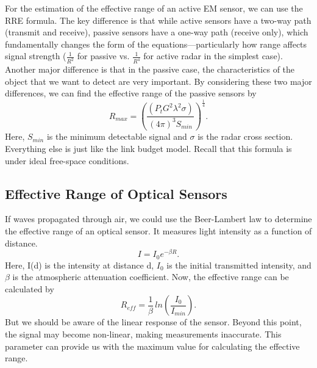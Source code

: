 \documentclass{article}
\begin{document}
For the estimation of the effective range of an active EM sensor, we can use the RRE formula.
The key difference is that while active sensors have a two-way path (transmit and receive), passive sensors have a one-way path (receive only), which fundamentally changes the form of the equations—particularly how range affects signal strength ($\frac{1}{R^2}$ for passive vs. $\frac{1}{R^4}$ for active radar in the simplest case). Another major difference is that in the passive case, the characteristics of the object that we want to detect are very important. By considering these two major differences, we can find the effective range of the passive sensors by
\begin{equation}
    R_{max}=\left(\frac{(P_tG^2\lambda^2\sigma)}{(4\pi)^3S_{min}}\right)^{\frac{1}{4}}.
\end{equation}
Here, $S_{min}$ is the minimum detectable signal and $\sigma$ is the radar cross section. Everything else is just like the link budget model.
Recall that this formula is under ideal free-space conditions. 
 \subsection{Effective Range of Optical Sensors}
 If waves propagated through air, we could use the Beer-Lambert law to determine the effective range of an optical sensor. It measures light intensity as a function of distance.
 \begin{equation}
     I = I_0 e^{-\beta R}.
 \end{equation}
 Here, I(d) is the intensity at distance d, $I_0$ is the initial transmitted intensity, and $\beta$ is the atmospheric attenuation coefficient. Now, the effective range can be calculated by
 \begin{equation}
     R_{eff} = \frac{1}{\beta}\, ln(\frac{I_0}{I_{min}}).
     \label{eq;Beer-Lambert}
 \end{equation}
 But we should be aware of the linear response of the sensor. Beyond this point, the signal may become non-linear, making measurements inaccurate. This parameter can provide us with the maximum value for calculating the effective range.
\end{document}
